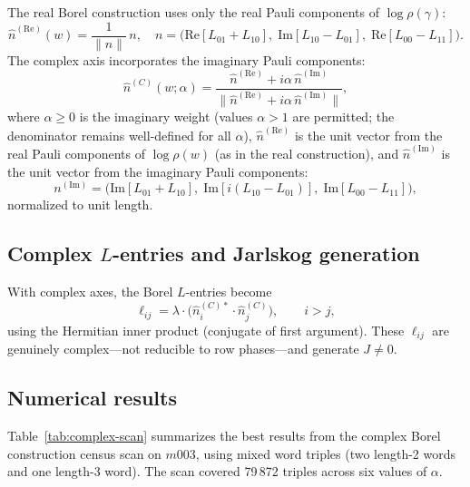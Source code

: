 ﻿\documentclass[epjc3]{svjour3}
\begin{document}
The real Borel construction uses only the real Pauli components of
$\log\rho(\gamma)$:
\begin{equation}
  \hat{n}^{(\mathrm{Re})}(w) = \frac{1}{\|n\|}\,n,
  \quad
  n = \bigl(\mathrm{Re}[L_{01}+L_{10}],\;
             \mathrm{Im}[L_{10}-L_{01}],\;
             \mathrm{Re}[L_{00}-L_{11}]\bigr).
  \label{eq:realaxis}
\end{equation}
The complex axis incorporates the imaginary Pauli components:
\begin{equation}
  \hat{n}^{(C)}(w;\alpha)
  = \frac{\hat{n}^{(\mathrm{Re})} + i\alpha\,\hat{n}^{(\mathrm{Im})}}
         {\|\hat{n}^{(\mathrm{Re})} + i\alpha\,\hat{n}^{(\mathrm{Im})}\|},
  \label{eq:complexaxis}
\end{equation}
where $\alpha \geq 0$ is the imaginary weight (values $\alpha > 1$
are permitted; the denominator remains well-defined for all $\alpha$),
$\hat{n}^{(\mathrm{Re})}$ is the unit vector from the real Pauli
components of $\log\rho(w)$ (as in the real construction), and
$\hat{n}^{(\mathrm{Im})}$ is the unit vector from the imaginary Pauli
components:
\begin{equation*}
  n^{(\mathrm{Im})} = \bigl(\mathrm{Im}[L_{01}+L_{10}],\;
                             \mathrm{Im}[i(L_{10}-L_{01})],\;
                             \mathrm{Im}[L_{00}-L_{11}]\bigr),
\end{equation*}
normalized to unit length.

\subsection{Complex $L$-entries and Jarlskog generation}
\label{subsec:jgen}

With complex axes, the Borel $L$-entries become
\begin{equation}
  \ell_{ij} = \lambda \cdot \bigl(\hat{n}^{(C)*}_i \cdot \hat{n}^{(C)}_j\bigr),
  \qquad i > j,
  \label{eq:complexL}
\end{equation}
using the Hermitian inner product (conjugate of first argument).
These $\ell_{ij}$ are genuinely complex---not reducible to row
phases---and generate $J \neq 0$.

\subsection{Numerical results}
\label{subsec:numresults}

Table~\ref{tab:complex-scan} summarizes the best results from the
complex Borel construction census scan on $m003$, using mixed word
triples (two length-2 words and one length-3 word).  The scan covered
79\,872 triples across six values of $\alpha$.
\end{document}
